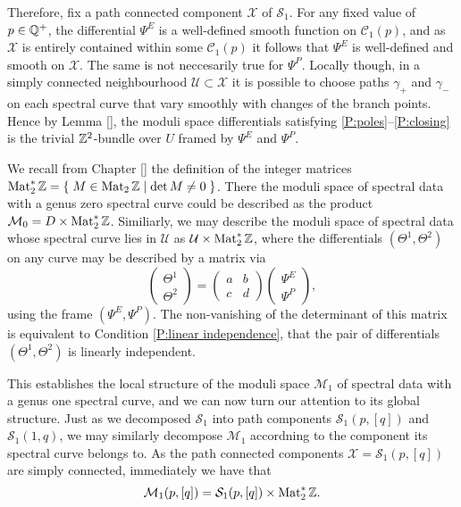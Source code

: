 Therefore, fix a path connected component $\mathcal{X}$ of $\mathcal{S}_1$. For any fixed value of $p \in \Q^+$, the differential $Ψ^E$ is a well-defined smooth function on $\mathcal{C}_1(p)$, and as $\mathcal{X}$ is entirely contained within some $\mathcal{C}_1(p)$ it follows that $Ψ^E$ is well-defined and smooth on $\mathcal{X}$. The same is not neccesarily true for $Ψ^P$.
Locally though, in a simply connected neighbourhood $\mathcal{U} \subset \mathcal{X}$ it is possible to choose paths $γ_+$ and $γ_-$ on each spectral curve that vary smoothly with changes of the branch points. Hence by Lemma \ref{}, the moduli space differentials satisfying \ref{P:poles}--\ref{P:closing} is the trivial $\Z^2$-bundle over $U$ framed by $Ψ^E$ and $Ψ^P$.

We recall from Chapter \ref{} the definition of the integer matrices $\Mat_2^*\Z = \Set{ M \in \Mat_2\Z }{\det M \neq 0}$. There the moduli space of spectral data with a genus zero spectral curve could be described as the product $\mathcal{M}_0 = D \times \Mat_2^*\Z$. Similiarly, we may describe the moduli space of spectral data whose spectral curve lies in $\mathcal{U}$ as $\mathcal{U} \times \Mat_2^*\Z$, where the differentials $(Θ^1,Θ^2)$ on any curve may be described by a matrix via
\[
\begin{pmatrix}
Θ^1 \\ Θ^2
\end{pmatrix}
=
\begin{pmatrix}
a & b \\
c & d
\end{pmatrix}
\begin{pmatrix}
Ψ^E \\ Ψ^P
\end{pmatrix},
\]
using the frame $(Ψ^E,Ψ^P)$. The non-vanishing of the determinant of this matrix is equivalent to Condition \ref{P:linear independence}, that the pair of differentials $(Θ^1,Θ^2)$ is linearly independent.

This establishes the local structure of the moduli space $\mathcal{M}_1$ of spectral data with a genus one spectral curve, and we can now turn our attention to its global structure. Just as we decomposed $\mathcal{S}_1$ into path components $\mathcal{S_1}(p,[q])$ and $\mathcal{S}_1(1,q)$, we may similarly decompose $\mathcal{M}_1$ accordning to the component its spectral curve belongs to. As the path connected components $\mathcal{X} = \mathcal{S}_1(p,[q])$ are simply connected, immediately we have that
\[
\mathcal{M}_1(p, [q]) = \mathcal{S}_1(p,[q]) \times \Mat_2^*\Z.
\]


